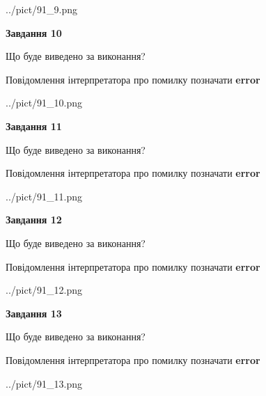 \documentclass[11pt, ukrainian]{article}
\begin{document}
{\begin {large}
\begin{center}
	{../pict/91_9.png}
\end{center}
\newpage

{\begin {center}\textbf{Завдання 10}\end {center}}\par
Що буде виведено за виконання? \par
Повідомлення інтерпретатора про помилку позначати \textbf{error}

\begin{center}
	{../pict/91_10.png}
\end{center}
\newpage

{\begin {center}\textbf{Завдання 11}\end {center}}\par
Що буде виведено за виконання? \par
Повідомлення інтерпретатора про помилку позначати \textbf{error}

\begin{center}
	{../pict/91_11.png}
\end{center}
\newpage

{\begin {center}\textbf{Завдання 12}\end {center}}\par
Що буде виведено за виконання? \par
Повідомлення інтерпретатора про помилку позначати \textbf{error}

\begin{center}
	{../pict/91_12.png}
\end{center}
\newpage

{\begin {center}\textbf{Завдання 13}\end {center}}\par
Що буде виведено за виконання? \par
Повідомлення інтерпретатора про помилку позначати \textbf{error}

\begin{center}
	{../pict/91_13.png}
\end{center}
\newpage


\end{large}}
\end{document}
